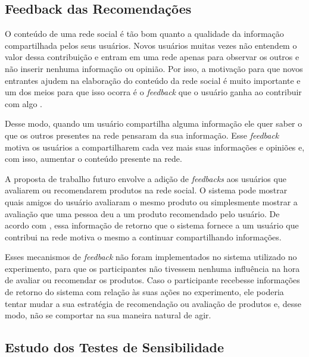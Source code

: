 
\subsection{Feedback das Recomendações} %
\label{sub:feedback_das_recomendacoes}

 O conteúdo de uma rede social é tão bom quanto a qualidade da informação compartilhada pelos seus usuários. Novos usuários muitas vezes não entendem o valor dessa contribuição e entram em uma rede apenas para observar os outros e não inserir nenhuma informação ou opinião. Por isso, a motivação para que novos entrantes ajudem na elaboração do conteúdo da rede social é muito importante e um dos meios para que isso ocorra é o \textit{feedback} que o usuário ganha ao contribuir com algo \cite{burke2009fmm}.
 
 Desse modo, quando um usuário compartilha alguma informação ele quer saber o que os outros presentes na rede pensaram da sua informação. Esse \textit{feedback} motiva os usuários a compartilharem cada vez mais suas informações e opiniões e, com isso, aumentar o conteúdo presente na rede.
 
 A proposta de trabalho futuro envolve a adição de \textit{feedbacks} aos usuários que avaliarem ou recomendarem produtos na rede social. O sistema pode mostrar quais amigos do usuário avaliaram o mesmo produto ou simplesmente mostrar a avaliação que uma pessoa deu a um produto recomendado pelo usuário. De acordo com \cite{burke2009fmm}, essa informação de retorno que o sistema fornece a um usuário que contribui na rede motiva o mesmo a continuar compartilhando informações.
 
 Esses mecanismos de \textit{feedback} não foram implementados no sistema utilizado no experimento, para que os participantes não tivessem nenhuma influência na hora de avaliar ou recomendar os produtos. Caso o participante recebesse informações de retorno do sistema com relação às suas ações no experimento, ele poderia tentar mudar a sua estratégia de recomendação ou avaliação de produtos e, desse modo, não se comportar na sua maneira natural de agir.


\subsection{Estudo dos Testes de Sensibilidade} %
\label{sub:estudo_dos_testes_de_sensibilidade}

